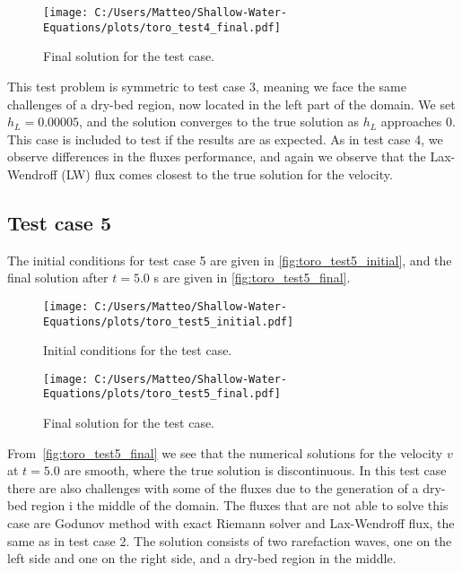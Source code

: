 \begin{figure}[H]
    \centering
    \texttt{[image: C:/Users/Matteo/Shallow-Water-Equations/plots/toro\_test4\_final.pdf]}
    \caption{Final solution for the test case.}\label{fig:toro_test4_final}
\end{figure}
This test problem is symmetric to test case 3, meaning we face the same challenges of a dry-bed region, now located in the left part of the domain.
We set $h_L = 0.00005$, and the solution converges to the true solution as $h_L$ approaches 0.
This case is included to test if the results are as expected.
As in test case 4, we observe differences in the fluxes performance, and again we observe that the Lax-Wendroff (LW) flux comes closest to the true solution for the velocity.

\subsection*{Test case 5}
The initial conditions for test case 5 are given in \autoref{fig:toro_test5_initial}, and the final solution after $t=5.0$ s are given in \autoref{fig:toro_test5_final}.
\begin{figure}[H]
    \centering
    \texttt{[image: C:/Users/Matteo/Shallow-Water-Equations/plots/toro\_test5\_initial.pdf]}
    \caption{Initial conditions for the test case.}\label{fig:toro_test5_initial}
\end{figure}

\begin{figure}[H]
    \centering
    \texttt{[image: C:/Users/Matteo/Shallow-Water-Equations/plots/toro\_test5\_final.pdf]}
    \caption{Final solution for the test case.}\label{fig:toro_test5_final}
\end{figure}
From~\autoref{fig:toro_test5_final} we see that the numerical solutions for the velocity $v$ at $t=5.0$ are smooth, where the true solution is discontinuous. 
In this test case there are also challenges with some of the fluxes due to the generation of a dry-bed region i the middle of the domain.
The fluxes that are not able to solve this case are Godunov method with exact Riemann solver and Lax-Wendroff flux, the same as in test case 2.
The solution consists of two rarefaction waves, one on the left side and one on the right side, and a dry-bed region in the middle.

